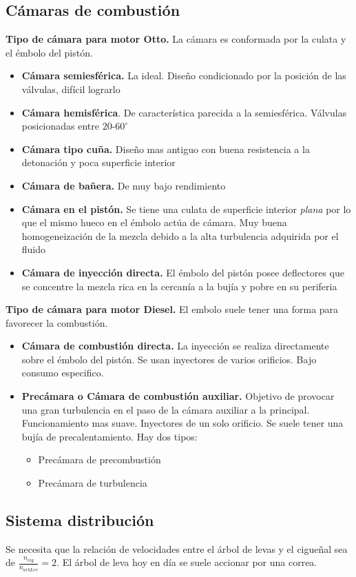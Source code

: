 \subsection{Cámaras de combustión}
\textbf{Tipo de cámara para motor Otto.} La cámara es conformada por la culata y el émbolo del pistón.
\begin{itemize}
\item \textbf{Cámara semiesférica.} La ideal. Diseño condicionado por la posición de las válvulas, difícil lograrlo
\item \textbf{Cámara hemisférica}. De característica parecida a la semiesférica. Válvulas posicionadas entre $20$-$60^\circ$
\item \textbf{Cámara tipo cuña.} Diseño mas antiguo con buena resistencia a la detonación y poca superficie interior
\item \textbf{Cámara de bañera.} De muy bajo rendimiento
\item \textbf{Cámara en el pistón.}  Se tiene una culata de superficie interior \textit{plana} por lo que el mismo hueco en el émbolo actúa de cámara. Muy buena homogeneización de la mezcla debido a la alta turbulencia adquirida por el fluido
\item \textbf{Cámara de inyección directa.} El émbolo del pistón posee deflectores que se concentre la mezcla rica en la cercanía a la bujía y pobre en su periferia
\end{itemize}

\textbf{Tipo de cámara para motor Diesel.}  El embolo suele tener una forma para favorecer la combustión.
\begin{itemize}
\item \textbf{Cámara de combustión directa.} La inyección se realiza directamente sobre el émbolo del pistón. Se usan inyectores de varios orificios. Bajo consumo especifico.
\item \textbf{Precámara o Cámara de combustión auxiliar.} Objetivo de provocar una gran turbulencia en el paso de la cámara auxiliar a la principal. Funcionamiento mas suave. Inyectores de un solo orificio. Se suele tener una bujía de precalentamiento. Hay dos tipos:
\begin{itemize}
\item Precámara de precombustión
\item Precámara de turbulencia
\end{itemize}
\end{itemize}

\subsection{Sistema distribución}
Se necesita que la relación de velocidades entre el árbol de levas y el cigueñal sea de $\frac{n_{cig}}{n_{arbLev}}=2$. El árbol de leva hoy en día se suele accionar por una correa. 

